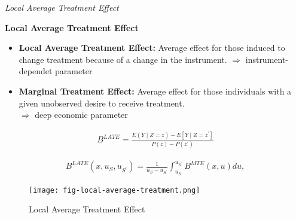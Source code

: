 \begin{frame}\begin{center}
\LARGE\textit{Local Average Treatment Effect}
\end{center}\end{frame}
\begin{frame}
\textbf{Local Average Treatment Effect}

\begin{itemize}
\item \textbf{Local Average Treatment Effect:} Average effect for those induced
to change treatment because of a change in the instrument.
\(\Rightarrow\) instrument-dependet parameter

\item \textbf{Marginal Treatment Effect:} Average effect for those individuals
with a given unobserved desire to receive treatment.\\
\(\Rightarrow\) deep economic parameter
\end{itemize}
\end{frame}

\begin{frame}
    \begin{align*}
B^{LATE} = \frac{E(Y\mid Z = z) - E[Y \mid Z = z^\prime]}{P(z) - P(z^\prime)}
\end{align*}

\begin{align*}
B^{LATE}(x, u_S, u_{S^\prime}) = \frac{1}{u_S - u_{S^\prime}} \int_{u_S}^{u_{S^\prime}} B^{MTE}(x, u) du,
\end{align*}

\end{frame}


\begin{frame}
\begin{figure}[htp]\centering
	\caption{Local Average Treatment Effect}\label{Local Average Treatment}\scalebox{0.35}
	{\texttt{[image: fig-local-average-treatment.png]}}
\end{figure}
\end{frame}

